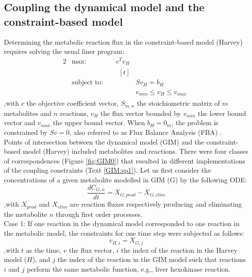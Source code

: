 \subsection{Coupling the dynamical model and the constraint-based model} \label{meth1}
Determining the metabolic reaction flux in the constraint-based model (Harvey) requires solving the usual liner program:
\begin{alignat*}{2}
  & \text{max: } &  & c^{T}v_{H}\\
  & \text{subject to: } &  &  
                \begin{aligned}[t] \\
                & Sv_{H} = b_{H} \\
                & v_{min} \leq v_{H}  \leq  v_{max}
                \end{aligned}
\end{alignat*}
,with $c$ the objective coefficient vector, $S_{m,n}$ the stoichiometric matrix of $m$ metabolites and $n$ reactions, $v_{H}$ the flux vector bounded by $v_{min}$ the lower bound vector and $v_{max}$ the upper bound  vector. When $b_{H}=0_{m}$, the problem is constrained by $Sv=0$, also referred to as Flux Balance Analysis (FBA) \cite{orth2010flux}.\\
Points of intersection between the dynamical model (GIM) and the constraint-based model (Harvey) included metabolites and reactions. There were four classes of correspondences (Figure \ref{fig:GIM0}) that resulted in different implementations of the coupling constraints (Text \ref{GIM:sp1}). Let us first consider the concentrations of a given metabolite modelled in GIM (G) by the following ODE:
\begin{equation*}
\frac{dC_{G,n}}{dt}=X_{G,prod}-X_{G,elim}
\end{equation*}
,with $X_{prod}$ and $X_{elim}$ are reaction fluxes respectively producing and eliminating the metabolite $n$ through first order processes.\\
Case 1: If one reaction in the dynamical model corresponded to one reaction in the metabolic model, the constraints for one time step were subjected as follows:
\begin{equation*}
v_{H,i}=X_{G,j}
\end{equation*}
,with $t$ as the time, $v$ the flux vector, $i$ the index of the reaction in the Harvey model ($H$), and $j$ the index of the reaction in the GIM model such that reactions $i$ and $j$ perform the same metabolic function, e.g., liver hexokinase reaction.\\ 
